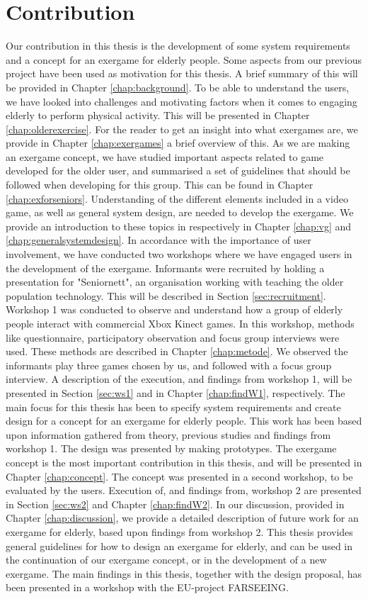 \section{Contribution}
Our contribution in this thesis is the development of some system requirements and a concept for an exergame for elderly people. Some aspects from our previous project \cite{project} have been used as motivation for this thesis. A brief summary of this will be provided in Chapter \ref{chap:background}. To be able to understand the users, we have looked into challenges and motivating factors when it comes to engaging elderly to perform physical activity. This will be presented in Chapter \ref{chap:olderexercise}. For the reader to get an insight into what exergames are, we provide in Chapter \ref{chap:exergames} a brief overview of this. As we are making an exergame concept, we have studied important aspects related to game developed for the older user, and summarised a set of guidelines that should be followed when developing for this group. This can be found in Chapter \ref{chap:exforseniors}. Understanding of the different elements included in a video game, as well as general system design, are needed to develop the exergame. We provide an introduction to these topics in respectively in Chapter \ref{chap:vg} and \ref{chap:generalsystemdesign}. In accordance with the importance of user involvement, we have conducted two workshops where we have engaged users in the development of the exergame. Informants were recruited by holding a presentation for "Seniornett", an organisation working with teaching the older population technology. This will be described in Section \ref{sec:recruitment}. Workshop 1 was conducted to observe and understand how a group of elderly people interact with commercial Xbox Kinect games. In this workshop, methods like questionnaire, participatory observation and focus group interviews were used. These methods are described in Chapter \ref{chap:metode}. We observed the informants play three games chosen by us, and followed with a focus group interview. A description of the execution, and findings from workshop 1, will be presented in Section \ref{sec:ws1} and in Chapter \ref{chap:findW1}, respectively. The main focus for this thesis has been to specify system requirements and create design for a concept for an exergame for elderly people. This work has been based upon information gathered from theory, previous studies and findings from workshop 1. The design was presented by making prototypes. The exergame concept is the most important contribution in this thesis, and will be presented in Chapter \ref{chap:concept}. The concept was presented in a second workshop, to be evaluated by the users. Execution of, and findings from, workshop 2 are presented in Section \ref{sec:ws2} and Chapter \ref{chap:findW2}. In our discussion, provided in Chapter \ref{chap:discussion}, we provide a detailed description of future work for an exergame for elderly, based upon findings from workshop 2. This thesis provides general guidelines for how to design an exergame for elderly, and can be used in the continuation of our exergame concept, or in the development of a new exergame. The main findings in this thesis, together with the design proposal, has been presented in a workshop with the EU-project FARSEEING.     

